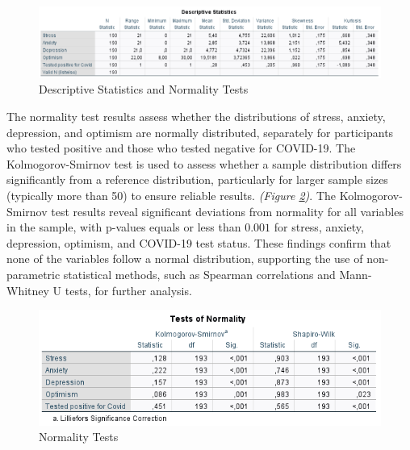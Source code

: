 \documentclass[a4paper]{article}
\begin{document}
\begin{figure}[ht]
  \centering
  \caption{Descriptive Statistics and Normality Tests}
  \label{fig:descriptiveSts}
  \includegraphics[width=\textwidth]{img/descriptive_statistics.png}
\end{figure}

\vspace{3em}
\noindent
The normality test results assess whether the distributions of stress, anxiety, depression, and optimism are normally distributed,
separately for participants who tested positive and those who tested negative for COVID-19.
The Kolmogorov-Smirnov test is used to assess whether a sample distribution differs significantly from a reference distribution,
particularly for larger sample sizes (typically more than 50) to ensure reliable results. \textit{(Figure \ref{fig:normalityTest})}.
\vspace{0.5em}\newline
The Kolmogorov-Smirnov test results reveal significant deviations from normality for all variables in the sample,
with p-values equals or less than \(\boldsymbol{0.001}\) for stress, anxiety, depression, optimism, and COVID-19 test status.
These findings confirm that none of the variables follow a normal distribution, supporting the use of non-parametric statistical methods,
such as Spearman correlations and Mann-Whitney U tests, for further analysis.
\vspace{1.5em}

\begin{figure}[H]
  \centering
  \caption{Normality Tests}
  \label{fig:normalityTest}
  \includegraphics[width=\textwidth]{img/normality_test.png}
\end{figure}
\end{document}

